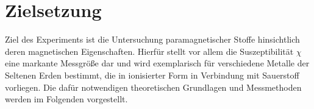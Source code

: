 \section{Zielsetzung}
\label{sec:Zielsetzung}

Ziel des Experiments ist die Untersuchung paramagnetischer Stoffe hinsichtlich deren magnetischen 
Eigenschaften. 
Hierfür stellt vor allem die Suszeptibilität $\chi$ eine markante Messgröße dar und wird exemplarisch 
für verschiedene Metalle der Seltenen Erden bestimmt, die in ionisierter Form in Verbindung mit Sauerstoff vorliegen. 
Die dafür notwendigen theoretischen Grundlagen und Messmethoden werden im Folgenden vorgestellt. 

